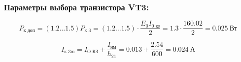 \subsubsection{Параметры выбора транзистора VT3:}
\begin{equation}
\label{eq:equation3_5}
P_{\text{к доп}} = (1.2 \ldots 1.5) P_{\text{к 3}} = (1.2 \ldots 1.5) \cdot \dfrac{E_0 I_{\text{0 кз}}}{2} = 1.3 \cdot \dfrac{16 0.02}{2} = 0.025~\text{Вт}
\end{equation}

\begin{equation}
\label{eq:equation3_6}
I_{\text{к 3m}} = I_{\text{О КЗ}} + \dfrac{I_{\text{нм}}}{h_21} = 0.013 + \dfrac{2.54}{600} = 0.024~\text{А}
\end{equation}
